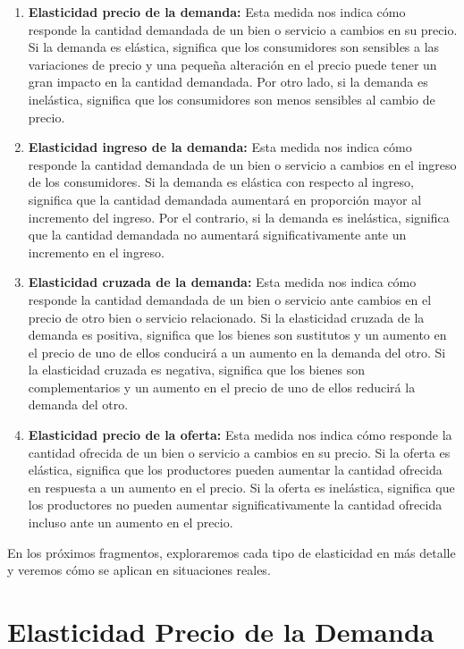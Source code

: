 \documentclass[
  a4paper,
]{article}
\begin{document}
\begin{enumerate}
\def\labelenumi{\arabic{enumi}.}
\item
  \textbf{Elasticidad precio de la demanda:} Esta medida nos indica cómo
  responde la cantidad demandada de un bien o servicio a cambios en su
  precio. Si la demanda es elástica, significa que los consumidores son
  sensibles a las variaciones de precio y una pequeña alteración en el
  precio puede tener un gran impacto en la cantidad demandada. Por otro
  lado, si la demanda es inelástica, significa que los consumidores son
  menos sensibles al cambio de precio.
\item
  \textbf{Elasticidad ingreso de la demanda:} Esta medida nos indica
  cómo responde la cantidad demandada de un bien o servicio a cambios en
  el ingreso de los consumidores. Si la demanda es elástica con respecto
  al ingreso, significa que la cantidad demandada aumentará en
  proporción mayor al incremento del ingreso. Por el contrario, si la
  demanda es inelástica, significa que la cantidad demandada no
  aumentará significativamente ante un incremento en el ingreso.
\item
  \textbf{Elasticidad cruzada de la demanda:} Esta medida nos indica
  cómo responde la cantidad demandada de un bien o servicio ante cambios
  en el precio de otro bien o servicio relacionado. Si la elasticidad
  cruzada de la demanda es positiva, significa que los bienes son
  sustitutos y un aumento en el precio de uno de ellos conducirá a un
  aumento en la demanda del otro. Si la elasticidad cruzada es negativa,
  significa que los bienes son complementarios y un aumento en el precio
  de uno de ellos reducirá la demanda del otro.
\item
  \textbf{Elasticidad precio de la oferta:} Esta medida nos indica cómo
  responde la cantidad ofrecida de un bien o servicio a cambios en su
  precio. Si la oferta es elástica, significa que los productores pueden
  aumentar la cantidad ofrecida en respuesta a un aumento en el precio.
  Si la oferta es inelástica, significa que los productores no pueden
  aumentar significativamente la cantidad ofrecida incluso ante un
  aumento en el precio.
\end{enumerate}

En los próximos fragmentos, exploraremos cada tipo de elasticidad en más
detalle y veremos cómo se aplican en situaciones reales.

\section{Elasticidad Precio de la
Demanda}\label{elasticidad-precio-de-la-demanda}
\end{document}
